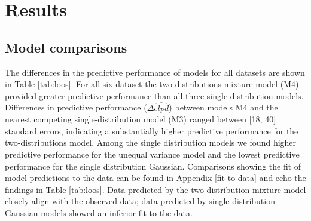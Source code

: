 \documentclass[
  man,floatsintext]{apa7}
\begin{document}
\hypertarget{results}{%
\section{Results}\label{results}}

\hypertarget{model-comparisons}{%
\subsection{Model comparisons}\label{model-comparisons}}

The differences in the predictive performance of models for all datasets are shown in Table \ref{tab:loos}. For all six dataset the two-distributions mixture model (M4) provided greater predictive performance than all three single-distribution models. Differences in predictive performance (\(\Delta\widehat{elpd}\)) between models M4 and the nearest competing single-distribution model (M3) ranged between {[}18, 40{]} standard errors, indicating a substantially higher predictive performance for the two-distributions model. Among the single distribution models we found higher predictive performance for the unequal variance model and the lowest predictive performance for the single distribution Gaussian. Comparisons showing the fit of model predictions to the data can be found in Appendix \ref{fit-to-data} and echo the findings in Table \ref{tab:loos}. Data predicted by the two-distribution mixture model closely align with the observed data; data predicted by single distribution Gaussian models showed an inferior fit to the data.
\end{document}
